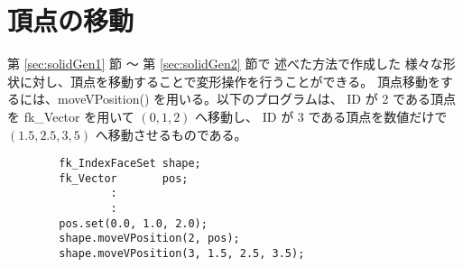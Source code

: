\section{頂点の移動} \label{sec:movevertex}
第 \ref{sec:solidGen1} 節 〜 第 \ref{sec:solidGen2} 節で
述べた方法で作成した
様々な形状に対し、頂点を移動することで変形操作を行うことができる。
頂点移動をするには、moveVPosition() を用いる。以下のプログラムは、
ID が 2 である頂点を fk\_Vector を用いて \((0, 1, 2)\) へ移動し、
ID が 3 である頂点を数値だけで \((1.5, 2.5, 3,5)\) へ移動させるものである。
\\
\begin{breakbox}
\begin{verbatim}
        fk_IndexFaceSet shape;
        fk_Vector       pos;
                :
                :
        pos.set(0.0, 1.0, 2.0);
        shape.moveVPosition(2, pos);
        shape.moveVPosition(3, 1.5, 2.5, 3.5);
\end{verbatim}
\end{breakbox}

